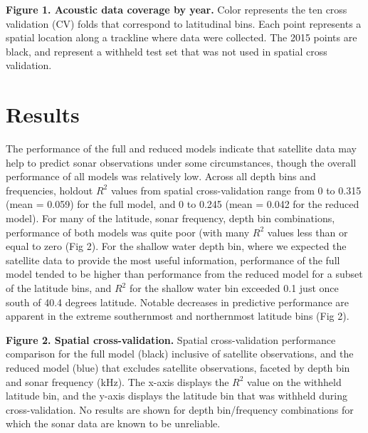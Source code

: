 \documentclass[10pt,letterpaper]{article}
\begin{document}
{\bf Figure 1. Acoustic data coverage by year.} Color represents the ten cross validation (CV) folds that correspond to latitudinal bins. Each point represents a spatial location along a trackline where data were collected. The 2015 points are black, and represent a withheld test set that was not used in spatial cross validation.


\section*{Results}
The performance of the full and reduced models indicate that satellite data may help to predict sonar observations under some circumstances, though the overall performance of all models was relatively low. 
Across all depth bins and frequencies, holdout $R^2$ values from spatial cross-validation range from 0 to 0.315 (mean = 0.059) for the full model, and 0 to 0.245 (mean = 0.042 for the reduced model).
For many of the latitude, sonar frequency, depth bin combinations, performance of both models was quite poor (with many $R^2$ values less than or equal to zero (Fig 2). 
For the shallow water depth bin, where we expected the satellite data to provide the most useful information, performance of the full model tended to be higher than performance from the reduced model for a subset of the latitude bins, and $R^2$ for the shallow water bin exceeded 0.1 just once south of 40.4 degrees latitude.
Notable decreases in predictive performance are apparent in the extreme southernmost and northernmost latitude bins (Fig 2).

{\bf Figure 2. Spatial cross-validation.} Spatial cross-validation performance comparison for the full model (black) inclusive of satellite observations, and the reduced model (blue) that excludes satellite observations, faceted by depth bin and sonar frequency (kHz). The x-axis displays the $R^2$ value on the withheld latitude bin, and the y-axis displays the latitude bin that was withheld during cross-validation. No results are shown for depth bin/frequency combinations for which the sonar data are known to be unreliable.
\end{document}
